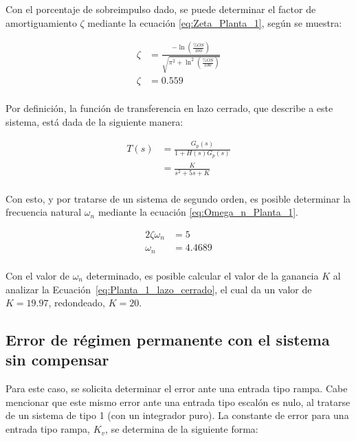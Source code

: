 \documentclass[journal]{IEEEtran}
\begin{document}
Con el porcentaje de sobreimpulso dado, se puede determinar el factor de amortiguamiento $\zeta$ 
mediante la ecuación \eqref{eq:Zeta_Planta_1}, según se muestra:

\begin{equation}
        \begin{aligned}
                \zeta &= \frac{-\ln(\frac{\%OS}{100})}{\sqrt{\pi^2+\ln^2(\frac{\%OS}{100})}} \\
                \zeta &= 0.559 \\
        \end{aligned}
\label{eq:Zeta_Planta_1}
\end{equation}


Por definición, la función de transferencia en lazo cerrado, que describe a este sistema,
está dada de la siguiente manera:


\begin{equation}
        \begin{aligned}
                T(s) &= \frac{G_p(s)}{1+H(s)G_p(s)} \\
                     &= \frac{K}{s^2+5s+K} \\
        \end{aligned}
\label{eq:Planta_1_lazo_cerrado}
\end{equation}

Con esto, y por tratarse de un sistema de segundo orden, es posible determinar 
la frecuencia natural $\omega_n$ mediante la ecuación \eqref{eq:Omega_n_Planta_1}.

\begin{equation}
        \begin{aligned}
                2\zeta\omega_n &= 5 \\
                \omega_n &= 4.4689 \\
        \end{aligned}
\label{eq:Omega_n_Planta_1}
\end{equation}

Con el valor de $\omega_n$ determinado, es posible calcular el valor de la ganancia $K$ al analizar la
Ecuación~\eqref{eq:Planta_1_lazo_cerrado}, el cual da un valor de $K = 19.97$, redondeado, $K = 20$.

\subsection{Error de régimen permanente con el sistema sin compensar}
Para este caso, se solicita determinar el error ante una entrada tipo rampa. Cabe mencionar
que este mismo error ante una entrada tipo escalón es nulo, al tratarse de un sistema de tipo 1 (con un integrador puro).
La constante de error para una entrada tipo rampa, $K_v$, se determina de la siguiente forma:
\end{document}
